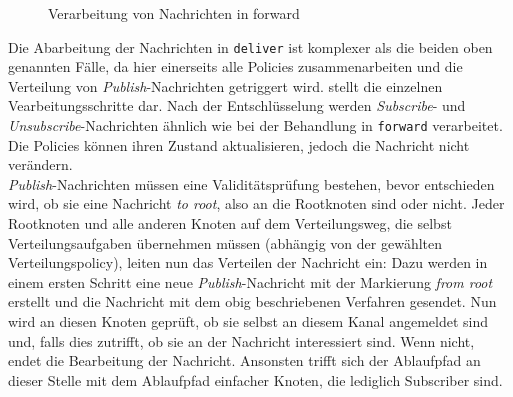 \begin{figure}[htbp]
\centering
{}
\caption{Verarbeitung von Nachrichten in forward}
\label{fig:processing_forward}
\end{figure}

Die Abarbeitung der Nachrichten in \texttt{deliver} ist komplexer als die beiden oben genannten Fälle, da hier einerseits alle Policies zusammenarbeiten und die Verteilung von \emph{Publish}-Nachrichten getriggert wird.  stellt die einzelnen Vearbeitungsschritte dar. Nach der Entschlüsselung werden \emph{Subscribe}- und \emph{Unsubscribe}-Nachrichten ähnlich wie bei der Behandlung in \texttt{forward} verarbeitet. Die Policies können ihren Zustand aktualisieren, jedoch die Nachricht nicht verändern.\\
\emph{Publish}-Nachrichten müssen eine Validitätsprüfung bestehen, bevor entschieden wird, ob sie eine Nachricht \emph{to root}, also an die Rootknoten sind oder nicht. Jeder Rootknoten und alle anderen Knoten auf dem Verteilungsweg, die selbst Verteilungsaufgaben übernehmen müssen (abhängig von der gewählten Verteilungspolicy), leiten nun das Verteilen der Nachricht ein: Dazu werden in einem ersten Schritt eine neue \emph{Publish}-Nachricht mit der Markierung \emph{from root} erstellt und die Nachricht mit dem obig beschriebenen Verfahren gesendet. Nun wird an diesen Knoten geprüft, ob sie selbst an diesem Kanal angemeldet sind und, falls dies zutrifft, ob sie an der Nachricht interessiert sind. Wenn nicht, endet die Bearbeitung der Nachricht. Ansonsten trifft sich der Ablaufpfad an dieser Stelle mit dem Ablaufpfad einfacher Knoten, die lediglich Subscriber sind.

